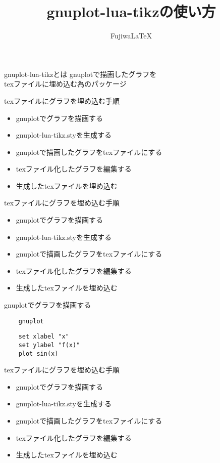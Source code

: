 \documentclass[a4j,uplatex,dvipdfmx]{beamer}
\title{gnuplot-lua-tikzの使い方}
\author{FujiwaLaTeX}
\institute{室蘭工業大学工学研究科 情報電子工学系専攻}
\begin{document}
\maketitle
\begin{frame}{gnuplot-lua-tikzとは}
  gnuplotで描画したグラフを \\ texファイルに埋め込む為のパッケージ
\end{frame}
\begin{frame}{texファイルにグラフを埋め込む手順}
  \begin{itemize}
    \item gnuplotでグラフを描画する
    \item gnuplot-lua-tikz.styを生成する
    \item gnuplotで描画したグラフをtexファイルにする
    \item texファイル化したグラフを編集する
    \item 生成したtexファイルを埋め込む
  \end{itemize}
\end{frame}
\begin{frame}{texファイルにグラフを埋め込む手順}
  \begin{itemize}
    \item \alert{gnuplotでグラフを描画する}
    \item gnuplot-lua-tikz.styを生成する
    \item gnuplotで描画したグラフをtexファイルにする
    \item texファイル化したグラフを編集する
    \item 生成したtexファイルを埋め込む
  \end{itemize}
\end{frame}
\begin{frame}[fragile]{gnuplotでグラフを描画する}
  \begin{verbatim}
    gnuplot
  \end{verbatim}
  \begin{verbatim}
    set xlabel "x"
    set ylabel "f(x)"
    plot sin(x)
  \end{verbatim}
\end{frame}
\begin{frame}{texファイルにグラフを埋め込む手順}
  \begin{itemize}
    \item gnuplotでグラフを描画する
    \item \alert{gnuplot-lua-tikz.styを生成する}
    \item gnuplotで描画したグラフをtexファイルにする
    \item texファイル化したグラフを編集する
    \item 生成したtexファイルを埋め込む
  \end{itemize}
\end{frame}
\end{document}
